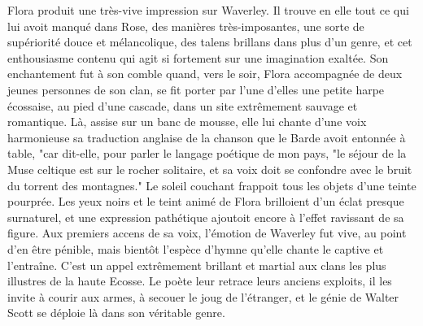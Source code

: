 Flora produit une très-vive impression sur Waverley. Il trouve en elle tout ce qui lui avoit manqué dans Rose, des manières très-imposantes, une sorte de supériorité douce et mélancolique, des talens brillans dans plus d'un genre, et cet enthousiasme contenu qui agit si fortement sur une imagination exaltée. Son enchantement fut à son comble quand, vers le soir, Flora accompagnée de deux jeunes personnes de son clan, se fit porter par l'une d'elles une petite harpe écossaise, au pied d'une cascade, dans un site extrêmement sauvage et romantique. Là, assise sur un banc de mousse, elle lui chante d'une voix harmonieuse sa traduction anglaise de la chanson que le Barde avoit entonnée à table, "car dit-elle, pour parler le langage poétique de mon pays, "le séjour de la Muse celtique est sur le rocher solitaire, et sa voix doit se confondre avec le bruit du torrent des montagnes." Le soleil couchant frappoit tous les objets d'une teinte pourprée. Les yeux noirs et le teint animé de Flora\setcounter{page}{128} brilloient d'un éclat presque surnaturel, et une expression pathétique ajoutoit encore à l'effet ravissant de sa figure. Aux premiers accens de sa voix, l'émotion de Waverley fut vive, au point d'en être pénible, mais bientôt l'espèce d'hymne qu'elle chante le captive et l'entraîne. C'est un appel extrêmement brillant et martial aux clans les plus illustres de la haute Ecosse. Le poète leur retrace leurs anciens exploits, il les invite à courir aux armes, à secouer le joug de l'étranger, et le génie de Walter Scott se déploie là dans son véritable genre.
